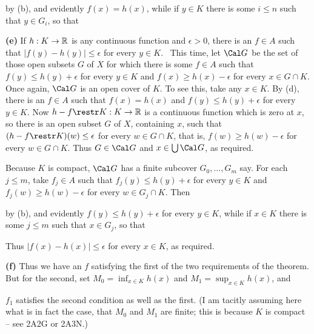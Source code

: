 { 
      
\noindent by (b), and evidently $f(x)=h(x)$, while if $y\in K$ there is 
some $i\le n$ such that $y\in G_i$, so that 
      
      
      
\medskip 
      
{\bf (e)} If $h:K\to\Bbb R$ is any continuous function and $\epsilon>0$, 
there is an $f\in A$ such that $|f(y)-h(y)|\le\epsilon$ for every $y\in 
K$.   \Prf\ This time, let $\Cal G$ be the set of those open subsets 
$G$ of $X$ for which there is some $f\in A$ such that $f(y)\le 
h(y)+\epsilon$ for every $y\in K$ and $f(x)\ge h(x)-\epsilon$ for every 
$x\in G\cap K$.   Once again, $\Cal G$ is an open cover of $K$.   To 
see this, take any $x\in K$.   By (d), there is an $f\in A$ such that 
$f(x)=h(x)$ and $f(y)\le h(y)+\epsilon$ for every $y\in K$.   Now 
$h-f\restr K:K\to\Bbb R$ is a continuous function which is zero at $x$, 
so there is an open subset $G$ of $X$, containing $x$, such that 
$(h-f\restr K)(w)\le\epsilon$ for every $w\in G\cap K$, that is, 
$f(w)\ge 
h(w)-\epsilon$ for every $w\in G\cap K$.   Thus $G\in\Cal G$ and 
$x\in\bigcup\Cal G$, as required. 
      
Because $K$ is compact, $\Cal G$ has a finite subcover $G_0,\ldots,G_m$ 
say.   For each $j\le m$, take $f_j\in A$ such that $f_j(y)\le 
h(y)+\epsilon$ for every $y\in K$ and $f_j(w)\ge h(w)-\epsilon$ for 
every $w\in G_j\cap K$.   Then 
      
      
\noindent by (b), and evidently $f(y)\le h(y)+\epsilon$ for every $y\in 
K$,  while if $x\in K$ there is some $j\le m$ such that $x\in G_j$, so 
that 
      
      
\noindent Thus $|f(x)-h(x)|\le\epsilon$ for every $x\in K$, as required. 
\Qed 
      
\medskip 
      
{\bf (f)} Thus we have an $f$ satisfying the first of the two 
requirements of the theorem.   But for the second, set 
$M_0=\inf_{x\in K}h(x)$ and $M_1=\sup_{x\in K}h(x)$, and 
      
      
\noindent $f_1$ satisfies the second condition as well as the first. 
(I am tacitly assuming here what is 
in fact the case, that $M_0$ and $M_1$ are finite;  this is because $K$ 
is compact -- see 2A2G or 2A3N.) 
}%
      
